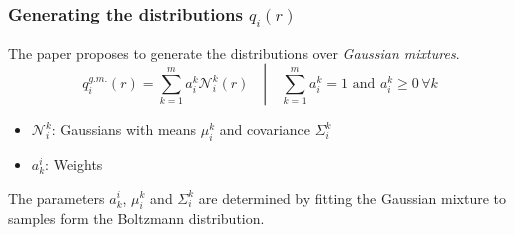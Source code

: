 \documentclass{beamer}
\begin{document}
	\begin{frame}
		\frametitle{Generating the distributions $q_i(r)$}
		The paper proposes to generate the distributions over \emph{Gaussian mixtures}.
		\begin{equation}
			q_i^{g.m.}(r)=\left.\sum_{k=1}^m a_i^k \mathcal{N}_i^k(r) \quad\right|\quad \sum_{k=1}^m a_i^k=1\text{ and } a_i^k \geq0\,\forall k
		\end{equation}
		\begin{itemize}
			\item $\mathcal{N}_i^k$: Gaussians with means $\mu_i^k$ and covariance $\Sigma_i^k$
			\item $a_k^i$: Weights
		\end{itemize}
		The  parameters $a_k^i$, $\mu_i^k$ and $\Sigma_i^k$ are determined by fitting the Gaussian mixture to samples form the Boltzmann distribution.
	\end{frame}


































\begin{frame}
  	\printbibliography[heading=bibintoc]

  \end{frame}
\end{document}
